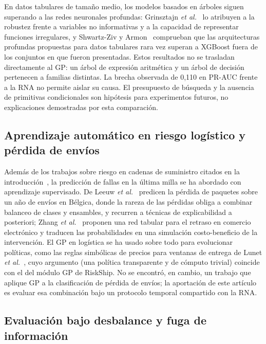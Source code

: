 \documentclass[conference]{IEEEtran}
\begin{document}
En datos tabulares de tamaño medio, los modelos basados en árboles siguen
superando a las redes neuronales profundas: Grinsztajn
\textit{et al.}~\cite{grinsztajn} lo atribuyen a la robustez frente a
variables no informativas y a la capacidad de representar funciones
irregulares, y Shwartz-Ziv y Armon~\cite{shwartz} comprueban que las
arquitecturas profundas propuestas para datos tabulares rara vez superan a
XGBoost fuera de los conjuntos en que fueron presentadas. Estos resultados no
se trasladan directamente al GP: un árbol de expresión aritmética y un árbol
de decisión pertenecen a familias distintas. La brecha observada de 0,110 en
PR-AUC frente a la RNA no permite aislar su causa. El presupuesto de búsqueda
y la ausencia de primitivas condicionales son hipótesis para experimentos
futuros, no explicaciones demostradas por esta comparación.

\subsection{Aprendizaje automático en riesgo logístico y pérdida de envíos}

Además de los trabajos sobre riesgo en cadenas de suministro citados en la
introducción~\cite{bortolini,ifac2022,nezamoddini}, la predicción de fallas
en la última milla se ha abordado con aprendizaje supervisado. De Leeuw
\textit{et al.}~\cite{deleeuw} predicen la pérdida de paquetes sobre un año
de envíos en Bélgica, donde la rareza de las pérdidas obliga a combinar
balanceo de clases y ensambles, y recurren a técnicas de explicabilidad a
posteriori; Zhang \textit{et al.}~\cite{zhang2026} proponen una red tabular
para el retraso en comercio electrónico y traducen las probabilidades en una
simulación costo-beneficio de la intervención. El GP en logística se ha usado
sobre todo para evolucionar políticas, como las reglas simbólicas de precios
para ventanas de entrega de Lunet \textit{et al.}~\cite{lunet}, cuyo
argumento (una política transparente y de cómputo trivial) coincide con el
del módulo GP de RiskShip. No se encontró, en cambio, un trabajo que aplique
GP a la clasificación de pérdida de envíos; la aportación de este artículo es
evaluar esa combinación bajo un protocolo temporal compartido con la RNA.

\subsection{Evaluación bajo desbalance y fuga de información}
\end{document}

